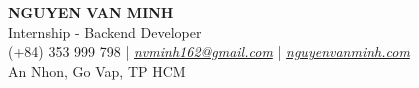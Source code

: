 \begin{center}
    {\fontsize{25}{28}\selectfont\bfseries NGUYEN VAN MINH}\\[4pt]
    {\large Internship - Backend Developer}\\[6pt]
    \small (+84) 353 999 798 \;|\; \href{mailto:nvminh162@gmail.com}{\textit{nvminh162@gmail.com}} \;|\; \href{https://nguyenvanminh.com}{\textit{nguyenvanminh.com}}\\[3pt]
    \small An Nhon, Go Vap, TP HCM
    \\ \vspace{-1pt}
\end{center}
